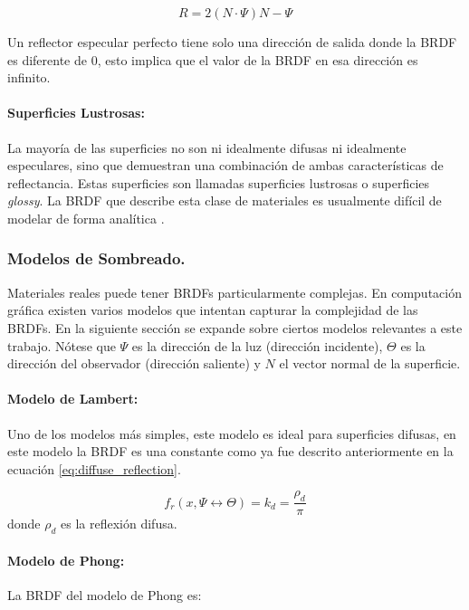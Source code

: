 \begin{equation}
    R = 2(N\cdot\Psi)N - \Psi
    \label{eq:reflectance_direction}
\end{equation}

Un reflector especular perfecto tiene solo una dirección de salida donde la \ac{BRDF} es diferente de $0$, esto implica que el valor de la \ac{BRDF} en esa dirección es infinito.

\paragraph{Superficies Lustrosas:}
La mayoría de las superficies no son ni idealmente difusas ni idealmente especulares, sino que demuestran una combinación de ambas características de reflectancia. Estas superficies son llamadas superficies lustrosas o superficies \emph{glossy}. La \ac{BRDF} que describe esta clase de materiales es usualmente difícil de modelar de forma analítica \cite{advanced_gi2006}.

\subsubsection{Modelos de Sombreado.}
Materiales reales puede tener \ac{BRDF}s particularmente complejas. En computación gráfica existen varios modelos que intentan capturar la complejidad de las \ac{BRDF}s. En la siguiente sección se expande sobre ciertos modelos relevantes a este trabajo. Nótese que $\Psi$ es la dirección de la luz (dirección incidente), $\Theta$ es la dirección del observador (dirección saliente) y $N$ el vector normal de la superficie.

\paragraph{Modelo de Lambert:}
Uno de los modelos más simples, este modelo es ideal para superficies difusas, en este modelo la \ac{BRDF} es una constante como ya fue descrito anteriormente en la ecuación \ref{eq:diffuse_reflection}.

\begin{equation}
    f_{r}(x, \Psi\leftrightarrow\Theta) = k_{d} = \frac{\rho_{d}}{\pi}
    \label{eq:lambert}
\end{equation} donde $\rho_{d}$ es la reflexión difusa.

\paragraph{Modelo de Phong:}
La \ac{BRDF} del modelo de Phong es:


